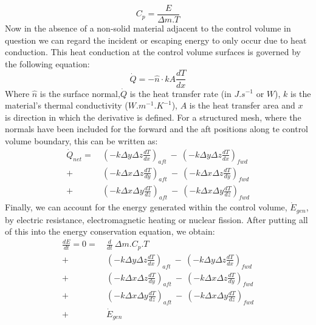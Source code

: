 \documentclass[11pt,letterpaper,titlepage]{article}
\begin{document}
\newline
\begin{equation}
C_p=\frac{E}{\Delta m.T}
\end{equation}
\newline
Now in the absence of a non-solid material adjacent to the control volume in question we can regard the incident or escaping energy to only occur due to heat conduction. This heat conduction at the control volume surfaces is governed by the following equation:
\newline
\begin{equation}
\dot{Q}=-\hat{n} \cdot kA\frac{dT}{dx}
\end{equation}
\newline
Where $\hat{n}$ is the surface normal,$\dot{Q}$ is the heat transfer rate (in $J.s^{-1}$ or $W$), $k$ is the material's thermal conductivity ($W.m^{-1}.K^{-1}$), $A$ is the heat transfer area and $x$ is direction in which the derivative is defined. For a structured mesh, where the normals have been included for the forward and the aft positions along te control volume boundary, this can be written as:
\newline
\begin{equation}
\begin{aligned}
\dot{Q}_{net}= & \ (-k\Delta y \Delta z\frac{dT}{dx})_{aft} \ - \ (-k\Delta y \Delta z\frac{dT}{dx})_{fwd} \\
             + & \ (-k\Delta x \Delta z\frac{dT}{dy})_{aft} \ - \ (-k\Delta x \Delta z\frac{dT}{dy})_{fwd} \\
             + & \ (-k\Delta x \Delta y \frac{dT}{dz})_{aft} \ - \ (-k\Delta x \Delta y \frac{dT}{dz})_{fwd}
\end{aligned}
\end{equation}
\newline
Finally, we can account for the energy generated within the control volume, $\dot{E}_{gen}$, by electric resistance, electromagnetic heating or nuclear fission. After putting all of this into the energy conservation equation, we obtain:
\begin{equation}
\begin{aligned}
\frac{dE}{dt}=0= & \ \frac{d}{dt} \ \Delta m.C_p.T \\
			   + & \ (-k\Delta y \Delta z\frac{dT}{dx})_{aft} \ - \ (-k\Delta y \Delta z\frac{dT}{dx})_{fwd} \\
	           + & \ (-k\Delta x \Delta z\frac{dT}{dy})_{aft} \ - \ (-k\Delta x \Delta z\frac{dT}{dy})_{fwd} \\
	           + & \ (-k\Delta x \Delta y \frac{dT}{dz})_{aft} \ - \ (-k\Delta x \Delta y \frac{dT}{dz})_{fwd} \\
	           + & \ \dot{E}_{gen}		       
\end{aligned}
\end{equation}
\end{document}
